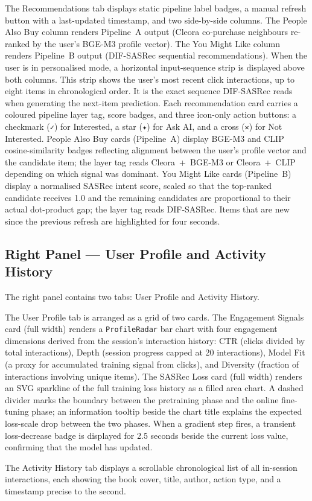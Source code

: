 The Recommendations tab displays static pipeline label badges, a manual refresh button with a last-updated timestamp, and two side-by-side columns.
The People Also Buy column renders Pipeline~A output (Cleora co-purchase neighbours re-ranked by the user's BGE-M3 profile vector).
The You Might Like column renders Pipeline~B output (DIF-SASRec sequential recommendations).
When the user is in personalised mode, a horizontal input-sequence strip is displayed above both columns.
This strip shows the user's most recent click interactions, up to eight items in chronological order. It is the exact sequence DIF-SASRec reads when generating the next-item prediction.
Each recommendation card carries a coloured pipeline layer tag, score badges, and three icon-only action buttons: a checkmark (\texttt{✓}) for Interested, a star (\texttt{✦}) for Ask AI, and a cross (\texttt{✕}) for Not Interested.
People Also Buy cards (Pipeline~A) display BGE-M3 and CLIP cosine-similarity badges reflecting alignment between the user's profile vector and the candidate item; the layer tag reads Cleora~+~BGE-M3 or Cleora~+~CLIP depending on which signal was dominant.
You Might Like cards (Pipeline~B) display a normalised SASRec intent score, scaled so that the top-ranked candidate receives 1.0 and the remaining candidates are proportional to their actual dot-product gap; the layer tag reads DIF-SASRec.
Items that are new since the previous refresh are highlighted for four seconds.

\subsection{Right Panel --- User Profile and Activity History}
\label{sec:app_profile_panel}

The right panel contains two tabs: User Profile and Activity History.

The User Profile tab is arranged as a grid of two cards.
The Engagement Signals card (full width) renders a \texttt{ProfileRadar} bar chart with four engagement dimensions derived from the session's interaction history: CTR (clicks divided by total interactions), Depth (session progress capped at 20 interactions), Model Fit (a proxy for accumulated training signal from clicks), and Diversity (fraction of interactions involving unique items).
The SASRec Loss card (full width) renders an SVG sparkline of the full training loss history as a filled area chart.
A dashed divider marks the boundary between the pretraining phase and the online fine-tuning phase; an information tooltip beside the chart title explains the expected loss-scale drop between the two phases.
When a gradient step fires, a transient loss-decrease badge is displayed for 2.5 seconds beside the current loss value, confirming that the model has updated.

The Activity History tab displays a scrollable chronological list of all in-session interactions, each showing the book cover, title, author, action type, and a timestamp precise to the second.
